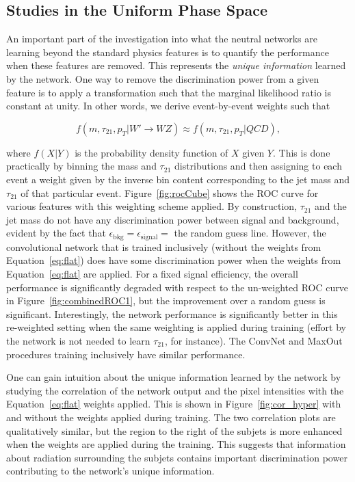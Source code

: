 \subsection{Studies in the Uniform Phase Space} %
\label{sub:flat_hypercube_studies}

An important part of the investigation into what the neutral networks are learning beyond the standard physics features is to quantify the performance when these features are removed.  This represents the {\it unique information} learned by the network.  One way to remove the discrimination power from a given feature is to apply a transformation such that the marginal likelihood ratio is constant at unity.  In other words, we derive event-by-event weights such that

\begin{equation}
\label{eq:flat}
  f(m, \tau_{21}, p_T| W'\rightarrow WZ) \approx f(m, \tau_{21}, p_T| QCD),
\end{equation}

\noindent where $f(X|Y)$ is the probability density function of $X$ given $Y$.  This is done practically by binning the mass and $\tau_{21}$ distributions and then assigning to each event a weight given by the inverse bin content corresponding to the jet mass and $\tau_{21}$ of that particular event. Figure~\ref{fig:rocCube} shows the ROC curve for various features with this weighting scheme applied.  By construction, $\tau_{21}$ and the jet mass do not have any discrimination power between signal and background, evident by the fact that $\epsilon_\text{bkg} = \epsilon_\text{signal} = $ the random guess line.    However, the convolutional network that is trained inclusively (without the weights from Equation~\ref{eq:flat}) does have some discrimination power when the weights from Equation~\ref{eq:flat} are applied.  For a fixed signal efficiency, the overall performance is significantly degraded with respect to the un-weighted ROC curve in Figure~\ref{fig:combinedROC1}, but the improvement over a random guess is significant.  Interestingly, the network performance is significantly better in this re-weighted setting when the same weighting is applied during training (effort by the network is not needed to learn $\tau_{21}$, for instance).  The ConvNet and MaxOut procedures training inclusively have similar performance.


One can gain intuition about the unique information learned by the network by studying the correlation of the network output and the pixel intensities with the Equation~\ref{eq:flat} weights applied.  This is shown in Figure~\ref{fig:cor_hyper} with and without the weights applied during training.  The two correlation plots are qualitatively similar, but the region to the right of the subjets is more enhanced when the weights are applied during the training.  This suggests that information about radiation surrounding the subjets contains important discrimination power contributing to the network's unique information.

